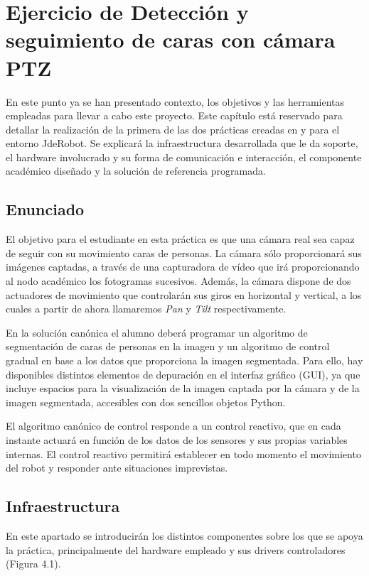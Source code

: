 \chapter{Ejercicio de Detección y seguimiento de caras con cámara PTZ}\label{cap.followface}
En este punto ya se han presentado contexto, los objetivos y las herramientas empleadas para llevar a cabo este proyecto. Este capítulo está reservado para detallar la realización de la primera de las dos prácticas creadas en y para el entorno JdeRobot. Se explicará la infraestructura desarrollada que le da soporte, el hardware involucrado y su forma de comunicación e interacción, el componente académico diseñado y la solución de referencia programada.

\section{Enunciado} \label{sec.enunciado}
El objetivo para el estudiante en esta práctica es que una cámara real sea capaz de seguir con su movimiento caras de personas. La cámara sólo proporcionará sus imágenes captadas, a través de una capturadora de vídeo que irá proporcionando al nodo académico los fotogramas sucesivos. Además, la cámara dispone de dos actuadores de movimiento que controlarán sus giros en horizontal y vertical, a los cuales a partir de ahora llamaremos \textit{Pan} y \textit{Tilt} respectivamente.

En la solución canónica el alumno deberá programar un algoritmo de segmentación de caras de personas en la imagen y un algoritmo de control gradual en base a los datos que proporciona la imagen segmentada. Para ello, hay disponibles distintos elementos de depuración en el interfaz gráfico (GUI), ya que incluye espacios para la visualización de la imagen captada por la cámara y de la imagen segmentada, accesibles con dos sencillos objetos Python.

El algoritmo canónico de control responde a un control reactivo, que en cada instante actuará en función de los datos de los sensores y sus propias variables internas. El control reactivo permitirá establecer en todo momento el movimiento del robot y responder ante situaciones imprevistas.

\section{Infraestructura}
En este apartado se introducirán los distintos componentes sobre los que se apoya la práctica, principalmente del hardware empleado y sus drivers controladores (Figura 4.1).

